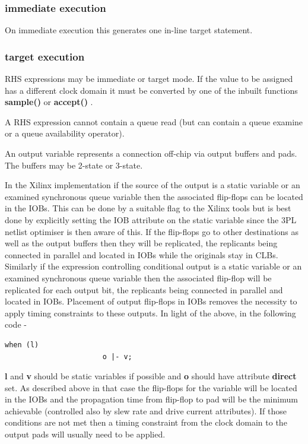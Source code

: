         \subsubsection{immediate execution}
        
            On immediate execution this generates one in-line target
            statement.
        
        \subsubsection{target execution}

            RHS expressions may be immediate or target mode. If the value to be
            assigned has a different clock domain it must be converted by one of
            the inbuilt functions {\bf sample()}  or {\bf
            accept()} .
            
            A RHS expression cannot contain a queue read (but can contain a queue
            examine or a queue availability operator).

            An output variable represents a connection off-chip via output buffers
            and pads. The buffers may be 2-state or 3-state.
            
            In the Xilinx implementation if the source of the output is a static
            variable or an examined synchronous queue variable then the associated
            flip-flops can be located in the IOBs. This can be done by a suitable
            flag to the Xilinx tools but is best done by explicitly setting the IOB
            attribute on the static variable since the 3PL netlist optimiser is
            then aware of this. If the flip-flops go to other destinations as well
            as the output buffers then they will be replicated, the replicants
            being connected in parallel and located in IOBs while the originals
            stay in CLBs. Similarly if the expression controlling conditional
            output is a static variable or an examined synchronous queue variable
            then the associated flip-flop will be replicated for each output bit,
            the replicants being connected in parallel and located in IOBs.
            Placement of output flip-flops in IOBs removes the necessity to apply
            timing constraints to these outputs. In light of the above, in the
            following code -
            \begin{lstlisting}[gobble=12, language=threepl]
                   when (l)
                       o |- v;
            \end{lstlisting}
            {\bf l} and {\bf v} should be static variables if possible and {\bf o}
            should have attribute {\bf direct} set. As described above in that case
            the flip-flops for the variable will be located in the IOBs and the
            propagation time from flip-flop to pad will be the minimum achievable
            (controlled also by slew rate and drive current attributes). If those
            conditions are not met then a timing constraint from the clock domain
            to the output pads will usually need to be applied.

